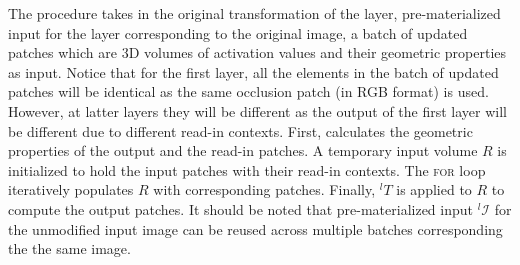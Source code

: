 \begin{algorithm}
\end{algorithm}


The  procedure takes in the original transformation of the layer, pre-materialized input for the layer corresponding to the original image, a batch of updated patches which are 3D volumes of activation values and their geometric properties as input.
Notice that for the first layer, all the elements in the batch of updated patches will be identical as the same occlusion patch (in RGB format) is used.
However, at latter layers they will be different as the output of the first layer will be different due to different read-in contexts.
First,  calculates the geometric properties of the output and the read-in patches.
A temporary input volume $R$ is initialized to hold the input patches with their read-in contexts.
The \textsc{for} loop iteratively populates $R$ with corresponding patches.
Finally, ${}^lT$ is applied to $R$ to compute the output patches.
It should be noted that pre-materialized input ${}^l\mathcal{I}$ for the unmodified input image can be reused across multiple batches corresponding the the same image.


